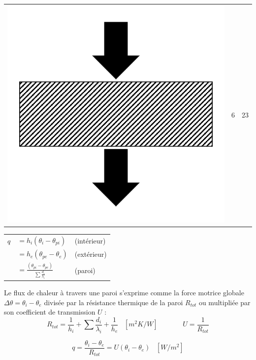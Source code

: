 \documentclass[11pt]{report}
\begin{document}
\begin{center}
\begin{tabular}{m{2cm}c c}
\includegraphics[scale=0.07]{sol}& 6 & 23\\
\end{tabular}
\end{center}


\begin{center}
\begin{tabular}{lll}
$q$ & $=h_i (\theta_i - \theta_{pi})$ & \; \; \; \; \; \; \; (intérieur)\\
%
 & $= h_e ( \theta_{pe} -  \theta_e)$ & \; \; \; \; \; \; \; (extérieur)\\
 & $=\displaystyle \frac{( \theta_{pi} -  \theta_{pe})}{\sum \frac{d_i}{\lambda_i}}$ & \; \; \; \; \; \; \;  (paroi)\\
\end{tabular}
\end{center}

Le flux de chaleur à travers une paroi s'exprime comme la force motrice globale $\Delta \theta = \theta_i - \theta_e$ divisée par la résistance thermique de la paroi $R_{tot}$ ou multipliée par son coefficient de transmission $U$ :
$$R_{tot} = \frac{1}{h_i}+ \displaystyle \sum \frac{d_i}{\lambda_i} +\frac{1}{h_e} \;\;\;[m^2K/W]\;\;\;\;\;\;\;\;\;\;\;\;\; U= \frac{1}{R_{tot}}$$

$$q=\frac{\theta_i - \theta_e}{R_{tot}} =U(\theta_i - \theta_e) \;\;\;[W/m^2]$$
\end{document}
